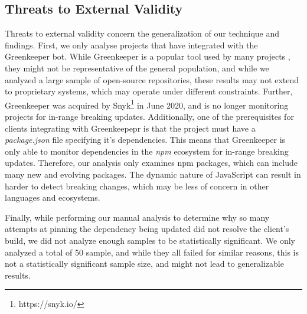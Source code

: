 \subsection{Threats to External Validity}
Threats to external validity concern the generalization of our technique and findings. First, we only analyse projects that have integrated with the Greenkeeper bot. While Greenkeeper is a popular tool used by many projects \cite{ACM2017_Mirhosseini_AutomatedPullRequests}, they might not be representative of the general population, and while we analyzed a large sample of open-source repositories, these results may not extend to proprietary systems, which may operate under different constraints. Further, Greenkeeper was acquired by Snyk\footnote{https://snyk.io/} in June 2020, and is no longer monitoring projects for in-range breaking updates. Additionally, one of the prerequisites for clients integrating with Greenkeepepr is that the project must have a \textit{package.json} file specifying it's dependencies. This means that Greenkeeper is only able to monitor dependencies in the \textit{npm} ecosystem for in-range breaking updates. Therefore, our analysis only examines npm packages, which can include many new and evolving packages. The dynamic nature of JavaScript can result in harder to detect breaking changes, which may be less of concern in other languages and ecosystems.
\par
Finally, while performing our manual analysis to determine why so many attempts at pinning the dependency being updated did not resolve the client's build, we did not analyze enough samples to be statistically significant. We only analyzed a total of 50 sample, and while they all failed for similar reasons, this is not a statistically significant sample size, and might not lead to generalizable results.